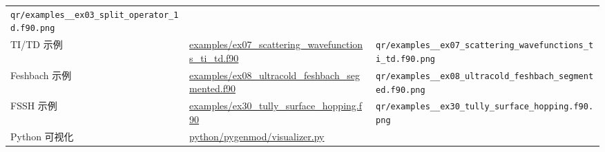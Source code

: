 \documentclass[
]{ctexbook}
\begin{document}
\begin{longtable}[]{@{}lll@{}}
\begin{minipage}[t]{0.30\columnwidth}
\texttt{qr/examples\_\_ex03\_split\_operator\_1d.f90.png}\strut
\end{minipage}\tabularnewline
\begin{minipage}[t]{0.30\columnwidth}\raggedright
TI/TD 示例\strut
\end{minipage} & \begin{minipage}[t]{0.30\columnwidth}\raggedright
\href{https://github.com/l1Ha/QuantumGeneralModule/blob/main/examples/ex07_scattering_wavefunctions_ti_td.f90}{examples/ex07\_scattering\_wavefunctions\_ti\_td.f90}\strut
\end{minipage} & \begin{minipage}[t]{0.30\columnwidth}\raggedright
\texttt{qr/examples\_\_ex07\_scattering\_wavefunctions\_ti\_td.f90.png}\strut
\end{minipage}\tabularnewline
\begin{minipage}[t]{0.30\columnwidth}\raggedright
Feshbach 示例\strut
\end{minipage} & \begin{minipage}[t]{0.30\columnwidth}\raggedright
\href{https://github.com/l1Ha/QuantumGeneralModule/blob/main/examples/ex08_ultracold_feshbach_segmented.f90}{examples/ex08\_ultracold\_feshbach\_segmented.f90}\strut
\end{minipage} & \begin{minipage}[t]{0.30\columnwidth}\raggedright
\texttt{qr/examples\_\_ex08\_ultracold\_feshbach\_segmented.f90.png}\strut
\end{minipage}\tabularnewline
\begin{minipage}[t]{0.30\columnwidth}\raggedright
FSSH 示例\strut
\end{minipage} & \begin{minipage}[t]{0.30\columnwidth}\raggedright
\href{https://github.com/l1Ha/QuantumGeneralModule/blob/main/examples/ex30_tully_surface_hopping.f90}{examples/ex30\_tully\_surface\_hopping.f90}\strut
\end{minipage} & \begin{minipage}[t]{0.30\columnwidth}\raggedright
\texttt{qr/examples\_\_ex30\_tully\_surface\_hopping.f90.png}\strut
\end{minipage}\tabularnewline
\begin{minipage}[t]{0.30\columnwidth}\raggedright
Python 可视化\strut
\end{minipage} & \begin{minipage}[t]{0.30\columnwidth}\raggedright
\href{https://github.com/l1Ha/QuantumGeneralModule/blob/main/python/pygenmod/visualizer.py}{python/pygenmod/visualizer.py}\strut

\end{minipage}
\end{longtable}
\end{document}
